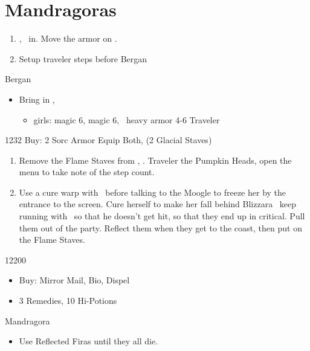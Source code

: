\chapter{Mandragoras}

\begin{enumerate}
\item \basch, \balthier\ in. Move the armor on \basch.
\item Setup traveler steps before Bergan
\end{enumerate}
\begin{battle}{Bergan}
\begin{itemize}
\vaanf Run up to Bergan
\item Bring in \ashe, \penelo
\begin{liscense}
\begin{itemize}
\item girls: magic 6, magic 6, \vaan\ heavy armor 4-6
\vaanf Traveler
\end{itemize}
\end{liscense}
\end{itemize}
\end{battle}
\begin{shop}{1232}
Buy: 2 Sorc Armor Equip Both, (2 Glacial Staves)
\end{shop}
\begin{enumerate}
\item Remove the Flame Staves from \ashe, \penelo.
\vaanf Traveler the Pumpkin Heads, open the menu to take note of the step count.
\item Use a cure warp with \ashe\ before talking to the Moogle to freeze her by the entrance to the screen.
\ashef Cure herself to make her fall behind
\penelof Blizzara \ashe\, keep running with \vaan\ so that he doesn't get hit, so that they end up in critical. Pull them out of the party. Reflect them when they get to the coast, then put on the Flame Staves.
\end{enumerate}
\begin{shop}{12200}
\begin{itemize}
\item Buy: Mirror Mail, Bio, Dispel
\item 3 Remedies, 10 Hi-Potions
\end{itemize}
\end{shop}
\begin{battle}{Mandragora}
\begin{itemize}
\vaanf Wait for them to gather up, then Traveler them.
\item Use Reflected Firas until they all die.
\end{itemize}
\end{battle}